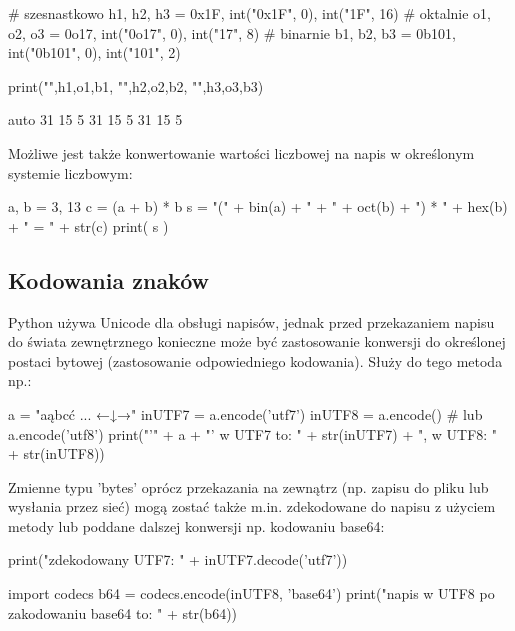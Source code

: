 \begin{CodeFrame}[python]{0.7\textwidth}
# szesnastkowo
h1, h2, h3 = 0x1F, int("0x1F", 0), int("1F", 16)
# oktalnie
o1, o2, o3 = 0o17, int("0o17", 0), int("17", 8)
# binarnie
b1, b2, b3 = 0b101, int("0b101", 0), int("101", 2)

print("",h1,o1,b1, "\n",h2,o2,b2, "\n",h3,o3,b3)
\end{CodeFrame}
\begin{CodeFrame}{auto}
 31 15 5
 31 15 5
 31 15 5
\end{CodeFrame}

Możliwe jest także konwertowanie wartości liczbowej na napis w określonym systemie liczbowym:

\begin{CodeFrame*}[python]{}
a, b = 3, 13
c = (a + b) * b
s = "(" + bin(a) + " + " + oct(b) + ") * " + hex(b) + " = " + str(c)
print( s )
\end{CodeFrame*} 

\subsection{Kodowania znaków}

Python używa Unicode dla obsługi napisów, jednak przed przekazaniem napisu do świata zewnętrznego konieczne może być zastosowanie konwersji do określonej postaci bytowej (zastosowanie odpowiedniego kodowania).
Służy do tego metoda  np.:

\begin{CodeFrame*}[python]{}
a = "aąbcć ... ←↓→"
inUTF7 = a.encode('utf7')
inUTF8 =  a.encode() # lub a.encode('utf8')
print("'" + a + "' w UTF7 to: " + str(inUTF7) + ", w UTF8: " + str(inUTF8))
\end{CodeFrame*}

Zmienne typu 'bytes' oprócz przekazania na zewnątrz (np. zapisu do pliku lub wysłania przez sieć) mogą zostać także m.in. zdekodowane do napisu z użyciem metody  lub poddane dalszej konwersji np. kodowaniu base64:

\begin{CodeFrame*}[python]{}
print("zdekodowany UTF7: " + inUTF7.decode('utf7'))

import codecs
b64 = codecs.encode(inUTF8, 'base64')
print("napis w UTF8 po zakodowaniu base64 to: " + str(b64))
\end{CodeFrame*}

